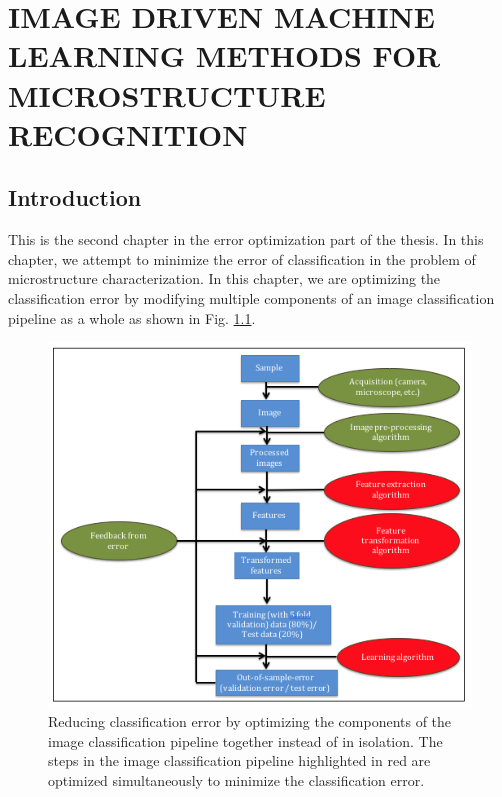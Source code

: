 \chapter{IMAGE DRIVEN MACHINE LEARNING METHODS FOR MICROSTRUCTURE RECOGNITION}
\label{chap:COMMAT}

\let\thefootnote\relax{}



\section{Introduction}
\label{intro}

This is the second chapter in the error optimization part of the thesis. In this chapter, we attempt to minimize the error of classification in the problem of microstructure characterization. In this chapter, we are optimizing the classification error by modifying multiple components of an image classification pipeline as a whole as shown in Fig. \ref{fig:chapter3}.

\begin{figure}[ht!]
\centering
\includegraphics[width=1.0\textwidth]{img/chapter3}
\caption{Reducing classification error by optimizing the components of the image classification pipeline together instead of in isolation. The steps in the image classification pipeline highlighted in red are optimized simultaneously to minimize the classification error.}
\label{fig:chapter3}
\end{figure}

